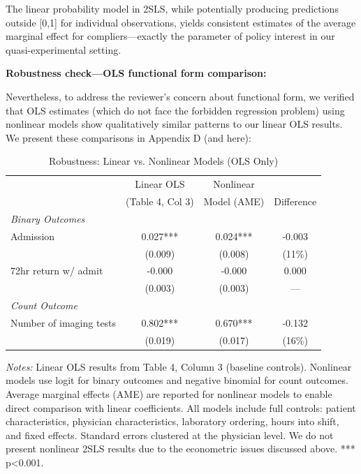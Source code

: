 \documentclass[11pt]{article}
\newcommand{\1}{\hbox{\rm 1\kern-.35em 1}}
\begin{document}
The linear probability model in 2SLS, while potentially producing predictions outside [0,1] for individual observations, yields consistent estimates of the average marginal effect for compliers—exactly the parameter of policy interest in our quasi-experimental setting.

\textbf{Robustness check—OLS functional form comparison:}

Nevertheless, to address the reviewer's concern about functional form, we verified that OLS estimates (which do not face the forbidden regression problem) using nonlinear models show qualitatively similar patterns to our linear OLS results. We present these comparisons in Appendix D (and here):

\begin{table}[H]
\centering
\caption*{Robustness: Linear vs. Nonlinear Models (OLS Only)}
\begin{threeparttable}
\begin{tabular}{lccc}
\toprule
& Linear OLS & Nonlinear & \\
& (Table 4, Col 3) & Model (AME) & Difference \\
\midrule
\textit{Binary Outcomes} \\
Admission & 0.027*** & 0.024*** & -0.003 \\
& (0.009) & (0.008) & (11\%) \\
72hr return w/ admit & -0.000 & -0.000 & 0.000 \\
& (0.003) & (0.003) & --- \\
\midrule
\textit{Count Outcome} \\
Number of imaging tests & 0.802*** & 0.670*** & -0.132 \\
& (0.019) & (0.017) & (16\%) \\
\bottomrule
\end{tabular}
\begin{tablenotes}
\footnotesize
\item \textit{Notes:} Linear OLS results from Table 4, Column 3 (baseline controls). Nonlinear models use logit for binary outcomes and negative binomial for count outcomes. Average marginal effects (AME) are reported for nonlinear models to enable direct comparison with linear coefficients. All models include full controls: patient characteristics, physician characteristics, laboratory ordering, hours into shift, and fixed effects. Standard errors clustered at the physician level. We do not present nonlinear 2SLS results due to the econometric issues discussed above. *** p<0.001.
\end{tablenotes}
\end{threeparttable}
\end{table}
\end{document}
